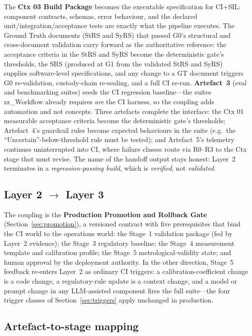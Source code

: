 \documentclass[11pt,a4paper]{article}
\newcommand{\verified}{\emph{verified}}
\newcommand{\validated}{\emph{validated}}
\begin{document}
The \textbf{Ctx 03 Build Package} becomes the executable specification for CI+SIL: component
contracts, schemas, error behaviour, and the declared unit/integration/acceptance tests are
exactly what the pipeline executes. The Ground Truth documents (StRS and SyRS) that passed
G0's structural and cross-document validation carry forward as the authoritative reference:
the acceptance criteria in the StRS and SyRS become the deterministic gate's thresholds, the
SRS (produced at G1 from the validated StRS and SyRS) supplies software-level specifications,
and any change to a GT document triggers G0 re-validation, custody-chain re-sealing, and a full CI re-run. \textbf{Artefact~3} (eval and benchmarking suites) seeds
the CI regression baseline---the suites zz\_Workflow already requires \emph{are} the CI harness,
so the coupling adds automation and not concepts. Three artefacts complete the interface: the
Ctx 01 measurable acceptance criteria become the deterministic gate's thresholds; Artefact~4's guardrail
rules become expected behaviours in the suite (e.g.\ the ``Uncertain''-below-threshold rule must
be tested); and Artefact~5's telemetry continues uninterrupted into CI, where failure classes
route via R0--R3 to the Ctx stage that must revise. The name of the handoff output stays honest:
Layer~2 terminates in a \emph{regression-passing build}, which is \verified, not \validated.

\subsection{Layer 2 $\rightarrow$ Layer 3}
\label{sec:l2-l3}

The coupling is the \textbf{Production Promotion and Rollback Gate} (Section~\ref{sec:promotion}), a
versioned contract with five prerequisites that bind the CI world to the operations world: the
Stage~1 validation package (fed by Layer~2 evidence); the Stage~3 regulatory baseline; the Stage~4
measurement template and calibration profile; the Stage~5 metrological-validity state; and human
approval by the deployment authority. In the other direction, Stage~5 feedback re-enters Layer~2
as ordinary CI triggers: a calibration-coefficient change is a code change, a regulatory-rule
update is a context change, and a model or prompt change in any LLM-assisted component fires the
full suite---the four trigger classes of Section~\ref{sec:triggers} apply unchanged in production.

\subsection{Artefact-to-stage mapping}
\label{sec:mapping}
\end{document}

